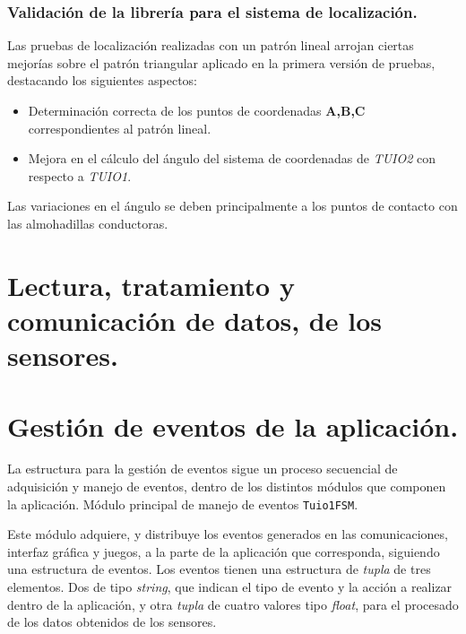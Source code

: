 \subsubsection{Validación de la librería para el sistema de localización.}
Las pruebas de localización realizadas con un patrón lineal arrojan ciertas mejorías sobre el patrón triangular aplicado en la primera versión de pruebas, destacando los siguientes aspectos:
\begin{itemize}
\item Determinación correcta de los puntos de coordenadas \textbf{A,B,C} correspondientes al patrón lineal.
\item Mejora en el cálculo del ángulo del sistema de coordenadas de \emph{TUIO2} con respecto a \emph{TUIO1}. 
\end{itemize}
Las variaciones en el ángulo se deben principalmente a los puntos de contacto con las almohadillas conductoras.

\section{Lectura, tratamiento y comunicación de datos, de los sensores.}

\section{Gestión de eventos de la aplicación.}
La estructura para la gestión de eventos sigue un proceso secuencial de adquisición y manejo de eventos, dentro de los distintos módulos que componen la aplicación.
Módulo principal de manejo de eventos \texttt{Tuio1FSM}.

Este módulo adquiere, y distribuye los eventos generados en las comunicaciones, interfaz gráfica y juegos, a la parte de la aplicación que corresponda, siguiendo una estructura de eventos.
Los eventos tienen una estructura de \emph{tupla} de tres elementos. Dos de tipo \emph{string}, que indican el tipo de evento y la acción a realizar dentro de la aplicación, y otra \emph{tupla} de cuatro valores tipo \emph{float}, para el procesado de los datos obtenidos de los sensores.


